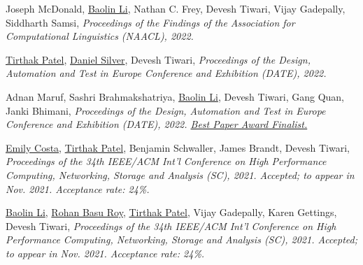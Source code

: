 {\textnormal{\newline Joseph McDonald, \underline{Baolin Li}, Nathan C. Frey, Devesh Tiwari, Vijay Gadepally, Siddharth Samsi,}} {\textit{Proceedings of the Findings of the Association for Computational Linguistics (NAACL), 2022.\newline}}{}{}{} %

{\textnormal{\newline \underline{Tirthak Patel}, \underline{Daniel Silver}, Devesh Tiwari,}} {\textit{Proceedings of the Design, Automation and Test in Europe Conference and Exhibition (DATE), 2022.\newline}}{}{}{} %

{\textnormal{\newline Adnan Maruf, Sashri Brahmakshatriya, \underline{Baolin Li}, Devesh Tiwari, Gang Quan, Janki Bhimani,}} {\textit{Proceedings of the Design, Automation and Test in Europe Conference and Exhibition (DATE), 2022. \underline{Best Paper Award Finalist.} \newline}}{}{}{} %



{\textnormal{\newline \underline{Emily Costa}, \underline{Tirthak Patel}, Benjamin Schwaller, James Brandt, Devesh Tiwari,}} {\textit{Proceedings of the 34th IEEE/ACM Int'l Conference on High Performance Computing, Networking, Storage and Analysis (SC), 2021. \textit{Accepted; to appear in Nov. 2021}. Acceptance rate: 24\%.\newline}}{}{}{} %

{\textnormal{\newline \underline{Baolin Li}, \underline{Rohan Basu Roy}, \underline{Tirthak Patel}, Vijay Gadepally, Karen Gettings, Devesh Tiwari,}} {\textit{Proceedings of the 34th IEEE/ACM Int'l Conference on High Performance Computing, Networking, Storage and Analysis (SC), 2021. \textit{Accepted; to appear in Nov. 2021}. Acceptance rate: 24\%.\newline}}{}{}{} %

